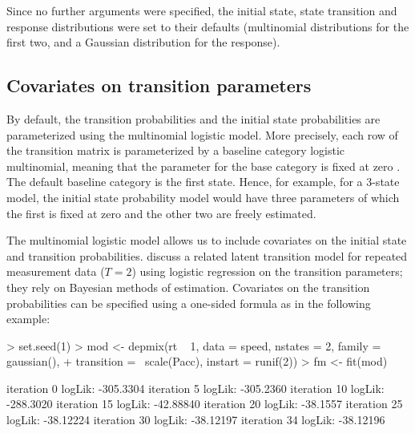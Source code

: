 \documentclass[article]{jss}
\begin{document}
Since no further arguments were specified, the initial state, state
transition and response distributions were set to their defaults
(multinomial distributions for the first two, and a Gaussian
distribution for the response).

\subsection{Covariates on transition parameters}

By default, the transition probabilities and the initial state
probabilities are parameterized using the multinomial logistic model.
More precisely, each row of the transition matrix is parameterized by
a baseline category logistic multinomial, meaning that the parameter
for the base category is fixed at zero \citep[see][p.\ 267 ff., for
multinomial logistic models and various
parameterizations]{Agresti2002}.  The default baseline category is the
first state.  Hence, for example, for a 3-state model, the initial
state probability model would have three parameters of which the first
is fixed at zero and the other two are freely estimated.

The multinomial logistic model allows us to include covariates on the
initial state and transition probabilities.  \citet{Chung2007} discuss
a related latent transition model for repeated measurement data
($T=2$) using logistic regression on the transition parameters; they
rely on Bayesian methods of estimation.  Covariates on the transition
probabilities can be specified using a one-sided formula as in the
following example:
\begin{Schunk}
\begin{Sinput}
> set.seed(1)
> mod <- depmix(rt ~ 1, data = speed, nstates = 2, family = gaussian(), 
+     transition = ~scale(Pacc), instart = runif(2))
> fm <- fit(mod)
\end{Sinput}
\begin{Soutput}
iteration 0 logLik: -305.3304 
iteration 5 logLik: -305.2360 
iteration 10 logLik: -288.3020 
iteration 15 logLik: -42.88840 
iteration 20 logLik: -38.1557 
iteration 25 logLik: -38.12224 
iteration 30 logLik: -38.12197 
iteration 34 logLik: -38.12196 
\end{Soutput}
\end{Schunk}
\end{document}
